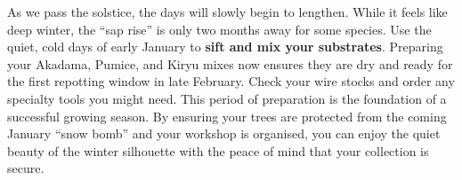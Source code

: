 \medskip
{}
\noindent
As we pass the solstice, the days will slowly begin to lengthen.
While it feels like deep winter, the ``sap rise'' is only two months away for some species.
Use the quiet, cold days of early January to \textbf{sift and mix your substrates}.
Preparing your Akadama, Pumice, and Kiryu mixes now ensures they are dry and ready for the first repotting window in late February.
Check your wire stocks and order any specialty tools you might need.
This period of preparation is the foundation of a successful growing season.
By ensuring your trees are protected from the coming January ``snow bomb'' and your workshop is organised, you can enjoy the quiet beauty of the winter silhouette with the peace of mind that your collection is secure.
\closearticle
\columnbreak
